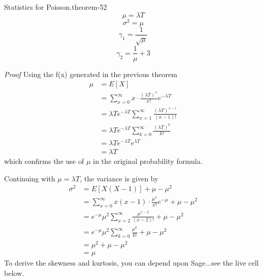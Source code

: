\documentclass[10pt,]{book}
\makeatletter
\renewcommand*{\proofname}{Proof}
\renewenvironment{proof}[1][\proofname]{\par
  \pushQED{\qed}%
  \normalfont \topsep6\p@\@plus6\p@\relax
  \trivlist
  \item\relax
    {\itshape
    #1\@addpunct{.}}\hspace\labelsep\ignorespaces
}{%
  \popQED\endtrivlist\@endpefalse
}
\numberwithin{equation}{section}
\makeatother
\begin{document}
%
\par
\hypertarget{p-1070}{}%
\begin{theorem}{Statistics for Poisson.}{}{theorem-52}%
\hypertarget{p-1071}{}%
%
\begin{equation*}
\mu = \lambda T
\end{equation*}
%
\begin{equation*}
\sigma^2 = \mu
\end{equation*}
%
\begin{equation*}
\gamma_1 = \frac{1}{\sqrt{\mu}}
\end{equation*}
%
\begin{equation*}
\gamma_2 = \frac{1}{\mu}+3
\end{equation*}
%
\end{theorem}
\begin{proof}\hypertarget{proof-55}{}
\hypertarget{p-1072}{}%
Using the f(x) generated in the previous theorem%
\begin{align*}
\mu & = E[X] \\
& = \sum_{x=0}^{\infty} x \cdot \frac{(\lambda T)^x}{x!} e^{-\lambda T}\\
& = \lambda T e^{-\lambda T} \sum_{x=1}^{\infty} \frac{(\lambda T)^{x-1}}{(x-1)!} \\
& = \lambda T e^{-\lambda T} \sum_{k=0}^{\infty} \frac{(\lambda T)^k}{k!} \\
& = \lambda T e^{-\lambda T} e^{\lambda T} \\
& = \lambda T 
\end{align*}
which confirms the use of \(\mu\) in the original probability formula.%
\par
\hypertarget{p-1073}{}%
Continuing with \(\mu = \lambda T\), the variance is given by%
\begin{align*}
\sigma^2 & = E[X(X-1)] + \mu - \mu^2 \\
& = \sum_{x=0}^{\infty} x(x-1) \cdot \frac{\mu^x}{x!} e^{-\mu} + \mu - \mu^2\\
& = e^{-\mu} \mu^2 \sum_{x=2}^{\infty} \frac{\mu^{x-2}}{(x-2)!} + \mu - \mu^2\\
& = e^{-\mu} \mu^2 \sum_{k=0}^{\infty} \frac{\mu^k}{k!} + \mu - \mu^2\\
& = \mu^2 + \mu - \mu^2 \\
& = \mu
\end{align*}
To derive the skewness and kurtosis, you can depend upon Sage...see the live cell below.%
\end{proof}
%
\par
\hypertarget{p-1074}{}%
\end{document}
